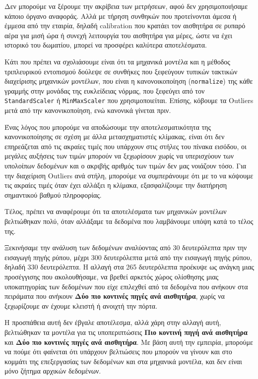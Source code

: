 Δεν μπορούμε να ξέρουμε την ακρίβεια των μετρήσεων, αφού δεν χρησιμοποιήσαμε κάποιο όργανο αναφοράς.
Αλλά με τήρηση συνθηκών που προτείνονται άμεσα ή έμμεσα από την εταιρία, δηλαδή calibration που κρατάει τον αισθητήρα σε ρυπαρό αέρα για μισή ώρα ή συνεχή λειτουργία του αισθητήρα για μέρες, ώστε να έχει ιστορικό του δωματίου,
μπορεί να προσφέρει καλύτερα αποτελέσματα. 

Κάτι που πρέπει να σχολιάσουμε είναι ότι τα μηχανικά μοντέλα και η μέθοδος τριπλευρικού εντοπισμού δούλεψε σε συνθήκες που ξεφεύγουν τυπικών τακτικών διαχείρισης μηχανικών μοντέλων,
που είναι η κανονοικοποίηση (\texttt{normalize}) της κάθε γραμμής στην μονάδας της ευκλείδειας νόρμας, που ξεφεύγει από τον \texttt{StandardScaler} ή \texttt{MinMaxScaler} που χρησιμοποιείται.
Επίσης, κόβουμε τα Outliers μετά από την κανονικοποίηση, ενώ κανονικά γίνεται πριν.

Ένας λόγος που μπορούμε να αποδώσουμε την αποτελεσματικότητα της κανονικοποίησης σε σχέση με άλλα μετασχηματιστές κλίμακας,
είναι ότι δεν επηρεάζεται από τις ακραίες τιμές που υπάρχουν στις στήλες του πίνακα εισόδου, οι μεγάλες αυξήσεις των τιμών μπορούν να ξεχωρίσουν χωρίς να υπερισχύουν των υπολοίπων δεδομένων
και ο ακριβής αριθμός των τιμών δεν μας νοιάζουν τόσο.
Για την διαχείριση Outliers ανά στήλη, μπορούμε να συμπεράνουμε ότι με το να κόψουμε τις ακραίες τιμές όταν έχει αλλάξει η κλίμακα, εξασφαλίζουμε την διατήρηση σημαντικού βαθμού πληροφορίας.

Τέλος, πρέπει να αναφέρουμε ότι τα αποτελέσματα των μηχανικών μοντέλων βελτιώθηκαν πολύ, όταν αλλάξαμε τα δεδομένα που λαμβάνουμε υπόψη κατά το τέλος της.

Ξεκινήσαμε την ανάλυση των δεδομένων αναλύοντας από 30 δευτερόλεπτα πριν την εισαγωγή 
πηγής ρύπου, μέχρι 300 δευτερόλεπτα μετά από την εισαγωγή πηγής ρύπου, δηλαδή 330 δευτερόλεπτα.
Η αλλαγή στα 265 δευτερόλεπτα προέκυψε ως ανάγκη μιας προσέγγισης που ακολουθήσαμε, να βρεθεί αρκετός χώρος ολίσθησης μιας υποκατηγορίας των δεδομένων που είχε επιλεχθεί από τα δεδομένα που ανήκουν στα πειράματα που ανήκουν \textbf{Δύο πιο κοντινές πηγές ανά αισθητήρα},
χωρίς να ξεχωρίζουμε αν έχουμε κλειστή ή ανοιχτή την πόρτα.

Η προσπάθεια αυτή δεν έβγαλε αποτέλεσμα, αλλά χάρη στην αλλαγή αυτή, βελτιώθηκαν τα μοντέλα για τις υποπεριπτώσεις \textbf{Πιο κοντινή πηγή ανά αισθητήρα} και \textbf{Δύο πιο κοντινές πηγές ανά αισθητήρα}.
Με βάση αυτή την εμπειρία, μπορούμε να πούμε ότι φαίνεται ότι υπάρχουν βελτιώσεις που μπορούν να γίνουν και στο κομμάτι της επεξεργασίας των δεδομένων και στα μηχανικά μοντέλα, και δεν είναι μόνο ζήτημα αρχικών δεδομένων. 

